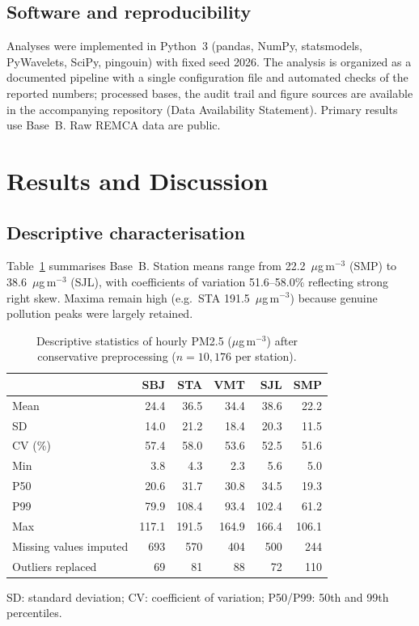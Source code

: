 \documentclass[12pt,letterpaper]{article}
\begin{document}
\subsection{Software and reproducibility}
\label{subsec:software}

Analyses were implemented in Python~3 (pandas, NumPy, statsmodels, PyWavelets, SciPy, pingouin) with fixed seed 2026. The analysis is organized as a documented pipeline with a single configuration file and automated checks of the reported numbers; processed bases, the audit trail and figure sources are available in the accompanying repository (Data Availability Statement). Primary results use Base~B. Raw REMCA data are public.

\section{Results and Discussion}
\label{sec:results}

\subsection{Descriptive characterisation}
\label{subsec:descriptive}

Table~\ref{tab:descriptive} summarises Base~B. Station means range from 22.2~$\mu$g\,m$^{-3}$ (SMP) to 38.6~$\mu$g\,m$^{-3}$ (SJL), with coefficients of variation 51.6--58.0\% reflecting strong right skew. Maxima remain high (e.g.\ STA 191.5~$\mu$g\,m$^{-3}$) because genuine pollution peaks were largely retained.

\begin{table}[t]
\centering
\caption{Descriptive statistics of hourly PM2.5 ($\mu$g\,m$^{-3}$) after conservative preprocessing ($n=10{,}176$ per station).}
\label{tab:descriptive}
\footnotesize
\setlength{\tabcolsep}{5pt}
\begin{tabular}{@{}lrrrrr@{}}
\toprule
 & SBJ & STA & VMT & SJL & SMP \\
\midrule
Mean & 24.4 & 36.5 & 34.4 & 38.6 & 22.2 \\
SD & 14.0 & 21.2 & 18.4 & 20.3 & 11.5 \\
CV (\%) & 57.4 & 58.0 & 53.6 & 52.5 & 51.6 \\
Min & 3.8 & 4.3 & 2.3 & 5.6 & 5.0 \\
P50 & 20.6 & 31.7 & 30.8 & 34.5 & 19.3 \\
P99 & 79.9 & 108.4 & 93.4 & 102.4 & 61.2 \\
Max & 117.1 & 191.5 & 164.9 & 166.4 & 106.1 \\
\midrule
Missing values imputed & 693 & 570 & 404 & 500 & 244 \\
Outliers replaced & 69 & 81 & 88 & 72 & 110 \\
\bottomrule
\end{tabular}
\par\vspace{2pt}
\footnotesize SD: standard deviation; CV: coefficient of variation; P50/P99: 50th and 99th percentiles.
\end{table}
\end{document}
